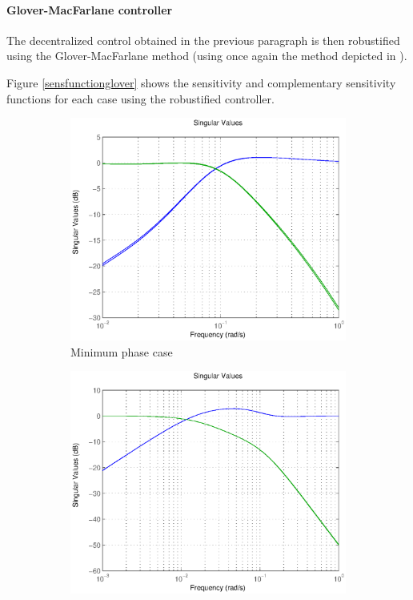\paragraph{Glover-MacFarlane controller}

The decentralized control obtained in the previous paragraph is then robustified using the Glover-MacFarlane method (using once again the method depicted in \cite{exo4}). 

Figure \ref{sensfunctionglover} shows the sensitivity and complementary sensitivity functions for each case using the robustified controller.

\begin{figure}[h!t]
        \centering
        \begin{subfigure}[b]{0.45\columnwidth}
                \includegraphics[width=\columnwidth]{fig/sensitivity_glover_minphase.eps}
                \caption{Minimum phase case}
        \end{subfigure}
        \begin{subfigure}[b]{0.45\columnwidth}
                \includegraphics[width=\columnwidth]{fig/sensitivity_glover_nonminphase.eps}

\end{subfigure}
\end{figure}
